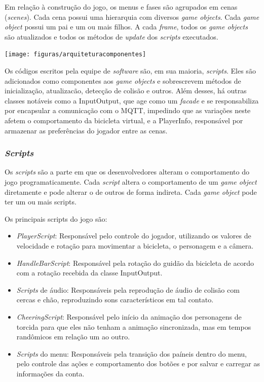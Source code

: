 Em relação à construção do jogo, os menus e fases são agrupados em cenas (\textit{scenes}). Cada cena possui uma hierarquia com diversos \textit{game objects}. Cada \textit{game object} possui um pai e um ou mais filhos. A cada \textit{frame}, todos os \textit{game objects} são atualizados e todos os métodos de \textit{update} dos \textit{scripts} executados.

\begin{center}
	\texttt{[image: figuras/arquiteturacomponentes]}
	\label{figura:arquiteturacomponentes}
\end{center}

Os códigos escritos pela equipe de \textit{software} são, em sua maioria, \textit{scripts}. Eles são adicionados como componentes aos \textit{game objects} e sobrescrevem métodos de inicialização, atualizacão, detecção de colisão e outros. Além desses, há outras classes notáveis como a InputOutput, que age como um \textit{facade} e se responsabiliza por encapsular a comunicação com o MQTT, impedindo que as variações neste afetem o comportamento da bicicleta virtual, e a PlayerInfo, responsável por armazenar as preferências do jogador entre as cenas.

\subsubsection{\textit{Scripts}}

Os \textit{scripts} são a parte em que os desenvolvedores alteram o comportamento do jogo programaticamente. Cada \textit{script} altera o comportamento de um \textit{game object} diretamente e pode alterar o de outros de forma indireta. Cada \textit{game object} pode ter um ou mais scripts.

Os principais scripts do jogo são:

\begin{itemize}
\item \textit{PlayerScript}: Responsável pelo controle do jogador, utilizando os valores de velocidade e rotação para movimentar a bicicleta, o personagem e a câmera.
\item \textit{HandleBarScript}: Responsável pela rotação do guidão da bicicleta de acordo com a rotação recebida da classe InputOutput.
\item \textit{Scripts} de áudio: Responsáveis pela reprodução de áudio de colisão com cercas e chão, reproduzindo sons característicos em tal contato.
\item \textit{CheeringScript}: Responsável pelo início da animação dos personagens de torcida para que eles não tenham a animação sincronizada, mas em tempos randômicos em relação um ao outro.
\item \textit{Scripts} do menu: Responsáveis pela transição dos paíneis dentro do menu, pelo controle das ações e comportamento dos botões e por salvar e carregar as informações da conta.
\end{itemize}

